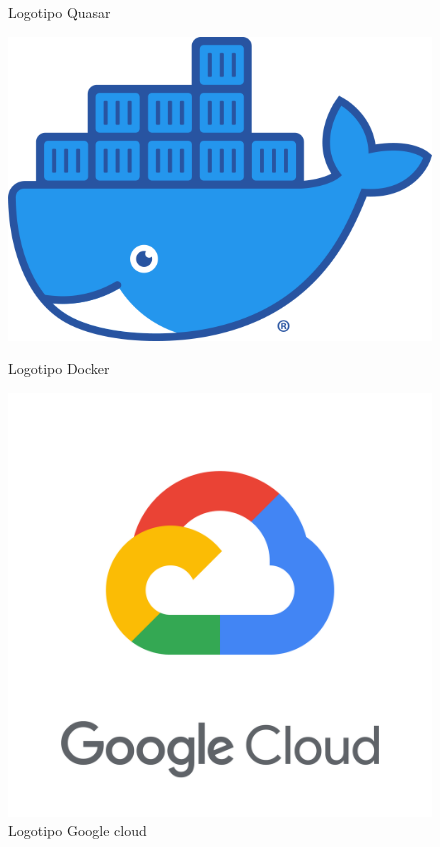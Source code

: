 \documentclass[11pt,spanish,listoffigures,listoftables]{tfgetsinf}
\begin{document}
\begin{figure}[!htb]
     \caption{Logotipo Quasar}\label{fig:LogoQuasar}
   \endminipage
\end{figure}


\begin{figure}[!htb]
   \includegraphics[width=\linewidth]{img/Moby-logo.png}
   \caption{Logotipo Docker}\label{fig:LogoDocker}
   \endminipage\hfill
     \includegraphics[width=\linewidth]{img/google_cloud_main.png}
     \caption{Logotipo Google cloud}\label{fig:LogoGcloud}

\end{figure}
\end{document}
